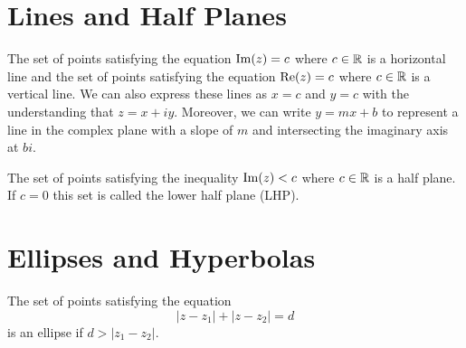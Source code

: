 \documentclass[handout]{ximera}
\begin{document}
\section{Lines and Half Planes}

\begin{example}[example 4]
The set of points satisfying the equation $\operatorname{Im}(z) = c$ where $c \in \mathbb R$ is a horizontal line and
the set of points satisfying the equation $\operatorname{Re}(z) = c$ where $c \in \mathbb R$ is a vertical line.
We can also express these lines as $x = c$ and $y = c$ with the understanding that $z = x + iy$.
Moreover, we can write $y = mx +b$ to represent a line in the complex plane with a
slope of $m$ and intersecting the imaginary axis at $bi$. 
\end{example}


\begin{example}[example 5]
The set of points satisfying the inequality $\operatorname{Im}(z) < c$ where $c \in \mathbb R$ is a
half plane. If $c=0$ this set is called the lower half plane (LHP). 

\end{example}

\begin{image}
\end{image}
\section{Ellipses and Hyperbolas}

\begin{example}[example 6]
The set of points satisfying the equation
\[
|z-z_1| + |z-z_2| = d
\]
is an ellipse if $d > |z_1 -z_2|$.
\end{example}
\end{document}
